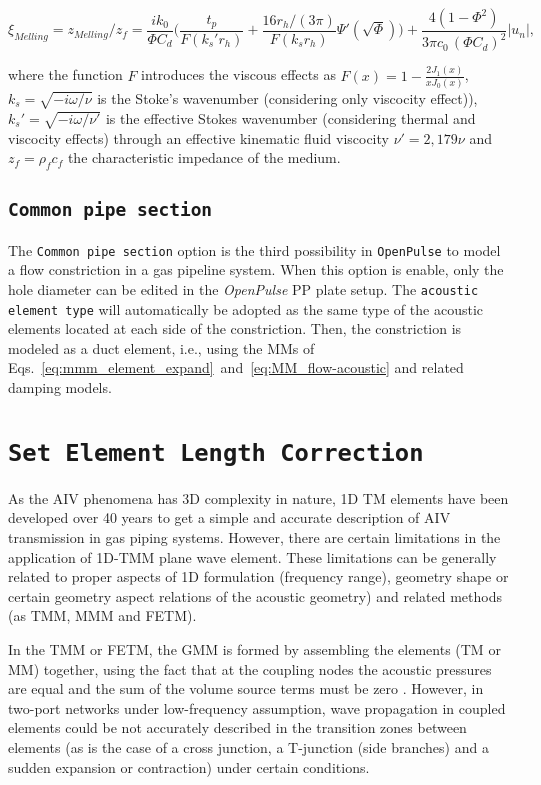 \documentclass[12pt]{article}
\begin{document}
 
\begin{equation}
	\xi_{Melling} = z_{Melling}/ z_f = \frac{ik_0}{\Phi C_d} \bigg( \frac{t_p}{F(k_s' r_h)} + \frac{16 r_h / (3\pi)  }{F(k_s r_h)} \Psi'(\sqrt{\Phi})\bigg) + \frac{4 (1-\Phi^2)}{ 3 \pi c_0 \, ( \Phi C_d)^2 } |u_n|,
\end{equation}

\noindent where the function $F$ introduces the viscous effects as $F(x) = 1 - \frac{2J_1(x)}{x J_0(x)}$, $k_s = \sqrt{-i\omega / \nu}$ is the Stoke's wavenumber (considering only viscocity effect)), $k_s' = \sqrt{-i\omega / \nu'}$ is the effective Stokes wavenumber (considering thermal and viscocity effects) through an effective kinematic fluid viscocity $\nu' = 2,179 \nu$ and $z_f=\rho_f c_f$ the characteristic impedance of the medium.

\subsection{\texttt{Common pipe section}}

The \texttt{Common pipe section} option is the third possibility in \texttt{OpenPulse} to model a flow constriction in a gas pipeline system. When this option is enable, only the hole diameter can be edited in the \textit{OpenPulse} \acrshort{PP} plate setup. The \texttt{acoustic element type} will automatically be adopted as the same type of the acoustic elements located at each side of the constriction. Then, the constriction is modeled as a duct element, i.e., using the \acrshort{MMs} of Eqs.~\ref{eq:mmm_element_expand}~and~\ref{eq:MM_flow-acoustic} and related damping models.

\section{\texttt{Set Element Length Correction}}

As the AIV phenomena has 3D complexity in nature, 1D \acrshort{TM} elements have been developed over 40 years to get a simple and accurate description of \acrshort{AIV} transmission in gas piping systems. However, there are certain limitations in the application of 1D-\acrshort{TMM} plane wave element. These limitations can be generally related to proper aspects of 1D formulation (frequency range), geometry shape or certain geometry aspect relations of the acoustic geometry) and related methods (as \acrshort{TMM}, \acrshort{MMM} and \acrshort{FETM}).

In the \acrshort{TMM} or \acrshort{FETM}, the \acrfull{GMM} is formed by assembling the elements (\acrshort{TM} or \acrshort{MM}) together, using the fact that at the coupling nodes the acoustic pressures are equal  and the sum of the volume source terms must be zero \cite{craggs1990, acoustics1d, FRID1989423}. However, in two-port networks under low-frequency assumption, wave propagation in coupled elements could be not accurately described in the transition zones between elements (as is the case of a cross junction, a T-junction (side branches) and a sudden expansion or contraction) under certain conditions.
\end{document}
